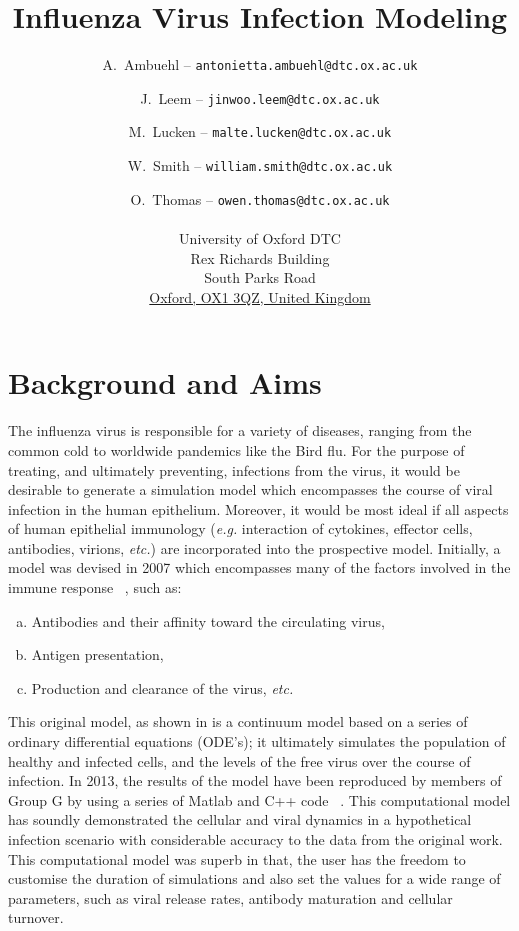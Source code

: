 \documentclass[a4paper, 12pt]{report}
\title{Influenza Virus Infection Modeling}
\author{A.~Ambuehl -- \texttt{antonietta.ambuehl@dtc.ox.ac.uk} \and J.~Leem -- \texttt{jinwoo.leem@dtc.ox.ac.uk} \and M.~Lucken -- \texttt{malte.lucken@dtc.ox.ac.uk} \and W.~Smith -- \texttt{william.smith@dtc.ox.ac.uk} \and O.~Thomas -- \texttt{owen.thomas@dtc.ox.ac.uk} \\\\
University of Oxford DTC \\
Rex Richards Building \\
South Parks Road\\
\underline{Oxford, OX1 3QZ, United Kingdom}\\
}
\begin{document}
\maketitle

%

\chapter{Background and Aims} %

The influenza virus is responsible for a variety of diseases, ranging from the common cold to worldwide pandemics like the Bird flu. For the purpose of treating, and ultimately preventing, infections from the virus, it would be desirable to generate a simulation model which encompasses the course of viral infection in the human epithelium. Moreover, it would be most ideal if all aspects of human epithelial immunology (\emph{e.g.} interaction of cytokines, effector cells, antibodies, virions, \emph{etc.}) are incorporated into the prospective model. Initially, a model was devised in 2007 which encompasses many of the factors involved in the immune response ~\cite{Hancioglu}, such as:
\begin{enumerate}[a.]
\item Antibodies and their affinity toward the circulating virus,
\item Antigen presentation,
\item Production and clearance of the virus, \emph{etc.}
\end{enumerate}


This original model, as shown in %
is a continuum model based on a series of ordinary differential equations (ODE's); it ultimately simulates the population of healthy and infected cells, and the levels of the free virus over the course of infection. 
In 2013, the results of the model have been reproduced by members of Group G by using a series of Matlab and C++ code ~\cite{GroupG}. This computational model has soundly demonstrated the cellular and viral dynamics in a hypothetical infection scenario with considerable accuracy to the data from the original work. This computational model was superb in that, the user has the freedom to customise the duration of simulations and also set the values for a wide range of parameters, such as viral release rates, antibody maturation and cellular turnover. \\
\end{document}
